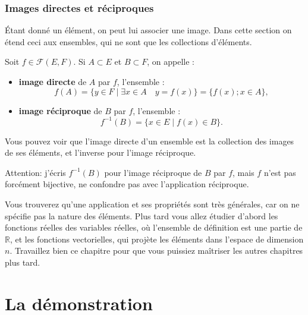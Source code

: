 \documentclass{article}
\begin{document}
\section{Images directes et réciproques}

Étant donné un élément, on peut lui associer une image. Dans cette section on étend ceci aux ensembles, qui ne sont que les collections d'éléments.

\begin{tcolorbox}[colback=red!5!white,colframe=red!75!black,title=Définition 3.8]

Soit $f \in \mathcal{F}(E,F)$. Si $A \subset E$ et $B \subset F$, on appelle :
\begin{itemize}
    \item \textbf{image directe} de $A$ par $f$, l’ensemble :
    \[
    f(A) = \{ y \in F \mid \exists x \in A \quad y = f(x) \} = \{ f(x) ; x \in A \},
    \]
    \item \textbf{image réciproque} de $B$ par $f$, l’ensemble :
    \[
    f^{-1}(B) = \{ x \in E \mid f(x) \in B \}.
    \]
\end{itemize}
\end{tcolorbox}

Vous pouvez voir que l'image directe d'un ensemble est la collection des images de ses éléments, et l'inverse pour l'image réciproque.

Attention: j'écris $f^{-1}(B)$ pour l'image réciproque de $B$ par $f$, mais $f$ n'est pas forcément bijective, ne confondre pas avec l'application réciproque. 

Vous trouverez qu'une application et ses propriétés sont très générales, car on ne spécifie pas la nature des éléments. Plus tard vous allez étudier d'abord les fonctions réelles des variables réelles, où l'ensemble de définition est une partie de $\mathbb{R}$, et les fonctions vectorielles, qui projète les éléments dans l'espace de dimension $n$. Travaillez bien ce chapitre pour que vous puissiez maîtriser les autres chapitres plus tard.





\newpage
\part{La démonstration}
\end{document}
